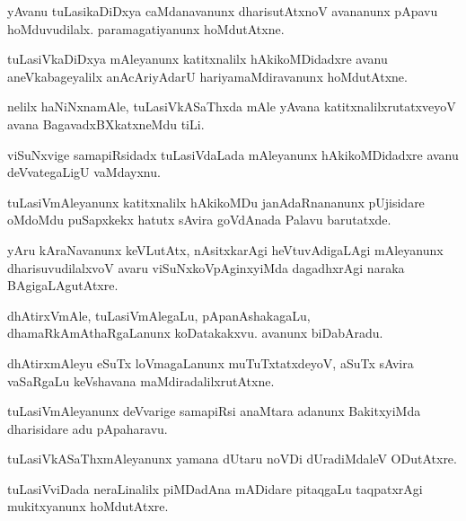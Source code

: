 \begin{mng}
yAvanu tuLasikaDiDxya caMdanavanunx dharisutAtxnoV avananunx pApavu hoMduvudilalx. paramagatiyanunx hoMdutAtxne.
\end{mng}

\begin{mng}
tuLasiVkaDiDxya mAleyanunx katitxnalilx hAkikoMDidadxre avanu aneVkabageyalilx anAcAriyAdarU hariyamaMdiravanunx hoMdutAtxne.
\end{mng}

\begin{mng}
nelilx haNiNxnamAle, tuLasiVkASaThxda mAle yAvana katitxnalilxrutatxveyoV avana BagavadxBXkatxneMdu tiLi.
\end{mng}

\begin{mng}
viSuNxvige samapiRsidadx tuLasiVdaLada mAleyanunx hAkikoMDidadxre avanu deVvategaLigU vaMdayxnu.
\end{mng}

\begin{mng}
tuLasiVmAleyanunx katitxnalilx hAkikoMDu janAdaRnananunx pUjisidare oMdoMdu puSapxkekx hatutx sAvira goVdAnada Palavu barutatxde.
\end{mng}

\begin{mng}
yAru kAraNavanunx keVLutAtx, nAsitxkarAgi heVtuvAdigaLAgi mAleyanunx dharisuvudilalxvoV avaru viSuNxkoVpAginxyiMda dagadhxrAgi naraka BAgigaLAgutAtxre.
\end{mng}

\begin{mng}
dhAtirxVmAle, tuLasiVmAlegaLu, pApanAshakagaLu, dhamaRkAmAthaRgaLanunx koDatakakxvu. avanunx biDabAradu.
\end{mng}

\begin{mng}
dhAtirxmAleyu eSuTx loVmagaLanunx muTuTxtatxdeyoV, aSuTx sAvira vaSaRgaLu keVshavana maMdiradalilxrutAtxne.
\end{mng}

\begin{mng}
tuLasiVmAleyanunx deVvarige samapiRsi anaMtara adanunx BakitxyiMda dharisidare adu pApaharavu.
\end{mng}

\begin{mng}
tuLasiVkASaThxmAleyanunx yamana dUtaru noVDi dUradiMdaleV ODutAtxre.
\end{mng}

\begin{mng}
tuLasiVviDada neraLinalilx piMDadAna mADidare pitaqgaLu taqpatxrAgi mukitxyanunx hoMdutAtxre.
\end{mng}

